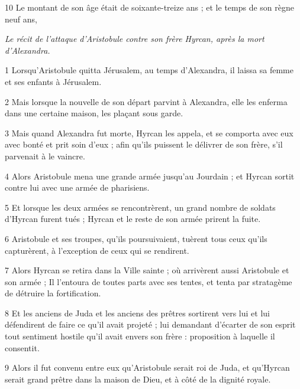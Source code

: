 \par 10 Le montant de son âge était de soixante-treize ans ; et le temps de son règne neuf ans,


\par \textit{Le récit de l'attaque d'Aristobule contre son frère Hyrcan, après la mort d'Alexandra.}

\par 1 Lorsqu'Aristobule quitta Jérusalem, au temps d'Alexandra, il laissa sa femme et ses enfants à Jérusalem.

\par 2 Mais lorsque la nouvelle de son départ parvint à Alexandra, elle les enferma dans une certaine maison, les plaçant sous garde.

\par 3 Mais quand Alexandra fut morte, Hyrcan les appela, et se comporta avec eux avec bonté et prit soin d'eux ; afin qu'ils puissent le délivrer de son frère, s'il parvenait à le vaincre.

\par 4 Alors Aristobule mena une grande armée jusqu'au Jourdain ; et Hyrcan sortit contre lui avec une armée de pharisiens.

\par 5 Et lorsque les deux armées se rencontrèrent, un grand nombre de soldats d'Hyrcan furent tués ; Hyrcan et le reste de son armée prirent la fuite.

\par 6 Aristobule et ses troupes, qu'ils poursuivaient, tuèrent tous ceux qu'ils capturèrent, à l'exception de ceux qui se rendirent.

\par 7 Alors Hyrcan se retira dans la Ville sainte ; où arrivèrent aussi Aristobule et son armée ; Il l'entoura de toutes parts avec ses tentes, et tenta par stratagème de détruire la fortification.

\par 8 Et les anciens de Juda et les anciens des prêtres sortirent vers lui et lui défendirent de faire ce qu'il avait projeté ; lui demandant d'écarter de son esprit tout sentiment hostile qu'il avait envers son frère : proposition à laquelle il consentit.

\par 9 Alors il fut convenu entre eux qu'Aristobule serait roi de Juda, et qu'Hyrcan serait grand prêtre dans la maison de Dieu, et à côté de la dignité royale.

